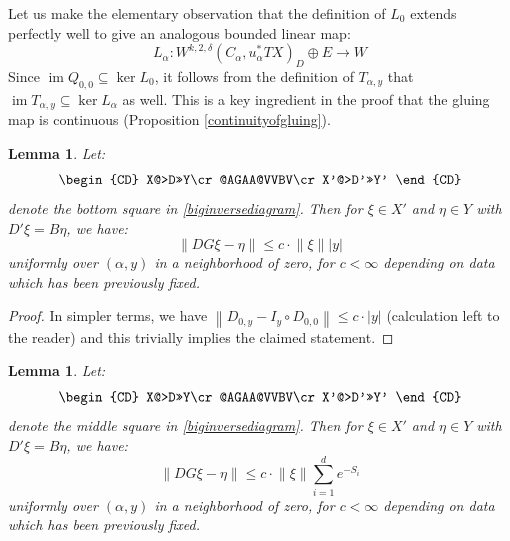 \documentclass[12pt]{article}
\newtheorem{lemma}[theorem]{Lemma}
\theoremstyle{definition}
\theoremstyle{remark}
\numberwithin{equation}{subsection}
\newcommand{\im}{\operatorname{im}}
\begin{document}
Let us make the elementary observation that the definition of $L_0$ extends perfectly well to give an analogous bounded linear map:
\begin{equation}\label{newLonpreglued}
L_\alpha:W^{k,2,\delta}(C_\alpha,u_\alpha^\ast TX)_D\oplus E\to W
\end{equation}
Since $\im Q_{0,0}\subseteq\ker L_0$, it follows from the definition of $T_{\alpha,y}$ that $\im T_{\alpha,y}\subseteq\ker L_\alpha$ as well.  This is a key ingredient in the proof that the gluing map is continuous (Proposition \ref{continuityofgluing}).

\begin{lemma}\label{approxbottom}
Let:
\begin{equation}
\begin{CD}
X@>D>>Y\cr
@AGAA@VVBV\cr
X'@>D'>>Y'
\end{CD}
\end{equation}
denote the bottom square in \eqref{biginversediagram}.  Then for $\xi\in X'$ and $\eta\in Y$ with $D'\xi=B\eta$, we have:
\begin{equation}
\left\|DG\xi-\eta\right\|\leq c\cdot\left\|\xi\right\|\left|y\right|
\end{equation}
uniformly over $(\alpha,y)$ in a neighborhood of zero, for $c<\infty$ depending on data which has been previously fixed.
\end{lemma}

\begin{proof}
In simpler terms, we have $\left\|D_{0,y}-I_y\circ D_{0,0}\right\|\leq c\cdot\left|y\right|$ (calculation left to the reader) and this trivially implies the claimed statement.
\end{proof}

\begin{lemma}\label{approxmiddle}
Let:
\begin{equation}
\begin{CD}
X@>D>>Y\cr
@AGAA@VVBV\cr
X'@>D'>>Y'
\end{CD}
\end{equation}
denote the middle square in \eqref{biginversediagram}.  Then for $\xi\in X'$ and $\eta\in Y$ with $D'\xi=B\eta$, we have:
\begin{equation}
\left\|DG\xi-\eta\right\|\leq c\cdot\left\|\xi\right\|\sum_{i=1}^de^{-S_i}
\end{equation}
uniformly over $(\alpha,y)$ in a neighborhood of zero, for $c<\infty$ depending on data which has been previously fixed.
\end{lemma}
\end{document}
